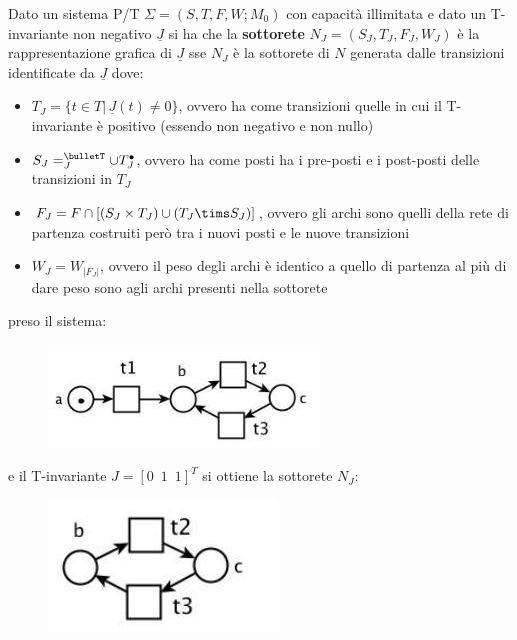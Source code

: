 \documentclass[a4paper,12pt, oneside]{book}
\begin{document}
\begin{definizione}
  Dato un sistema P/T $\Sigma=(S,T,F,W;M_0)$ con capacità illimitata e dato un
  T-invariante non negativo $\underline{J}$ si ha che la \textbf{sottorete} $N_J
  = (S_J , T_J , F_J , W_J)$ è la rappresentazione grafica di $\underline{J}$
  sse $N_J$ è la sottorete di $N$ generata dalle transizioni identificate da
  $\underline{J}$ dove:
  \begin{itemize}
    \item $T_J=\{t\in T|\,\underline{J}(t)\neq 0\}$, ovvero ha come transizioni
    quelle in cui il T-invariante è positivo (essendo non negativo e non nullo)
    \item $S_J=^\bulletT_J\cup T_J^\bullet$, ovvero ha come posti ha i pre-posti
    e i post-posti delle transizioni in $T_J$
    \item $F_J=F\cap[(S_J\times T_J)\cup(T_J\tims S_J)]$, ovvero gli archi sono
    quelli della rete di partenza costruiti però tra i nuovi posti e le nuove
    transizioni 
    \item $W_J=W_{|F_J|}$, ovvero il peso degli archi è identico a quello di
    partenza al più di dare peso sono agli archi presenti nella sottorete
  \end{itemize}
  \begin{esempio}
    preso il sistema:
    \begin{figure}[H]
      \centering
      \includegraphics[scale = 0.6]{img/ti.jpg}
    \end{figure}
    e il T-invariante $J=[0\,\,\,1\,\,\,1]^T$ si ottiene la sottorete $N_J$:
    \begin{figure}[H]
      \centering
      \includegraphics[scale = 0.5]{img/ti3.jpg}
    \end{figure}
  \end{esempio}
\end{definizione}
\end{document}
